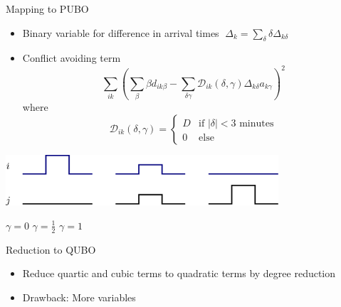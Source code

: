 \documentclass[10pt]{beamer}
\begin{document}
\begin{frame}[t]{Mapping to PUBO}
    \begin{itemize}
        \item Binary variable for difference in arrival times
            $
            \; \Delta_{k} = \sum_\delta \delta \Delta_{k\delta}
            $
        \item Conflict avoiding term
            \vspace{-0.1cm}
            \begin{equation*}
                \sum_{ik} \left(\sum_\beta \beta d_{ik\beta} - \sum_{\delta\gamma} \mathcal{D}_{ik}(\delta, \gamma)  \Delta_{k\delta} a_{k\gamma} \right)^2
            \end{equation*}
    where
    \vspace{-0.1cm}
    \begin{equation*}
        \mathcal{D}_{ik}(\delta, \gamma) = 
        \begin{cases}
            D &\text{if } |\delta| < 3 \text{ minutes} \\
            0 &\text{else}
        \end{cases}
    \end{equation*}
    \end{itemize}
    \vspace{-0.5cm}
    \begin{center}
        \includegraphics[width=0.76\textwidth]{images/conflict_delay_function_maneuver_without_labels.pdf}
    \end{center}
    \vspace{-0.3cm}
    \hspace{2.5cm}
    $\gamma = 0$ 
    \hspace{1.9cm}
    $\gamma=\frac{1}{2}$
    \hspace{1.9cm}
    $\gamma=1$
\end{frame}
\begin{frame}[t]{Reduction to QUBO}
   \begin{itemize}
       \item Reduce quartic and cubic terms to quadratic terms by degree reduction
       \item Drawback: More variables
   \end{itemize} 
\end{frame}
\end{document}
